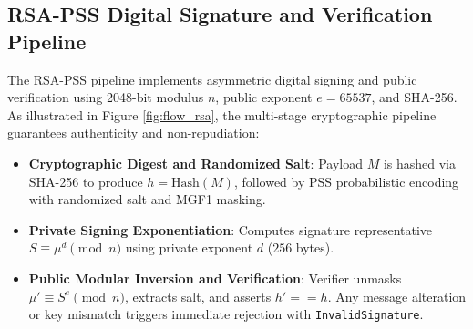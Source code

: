 \documentclass[12pt,a4paper]{report}
\begin{document}
\clearpage

\subsection{RSA-PSS Digital Signature and Verification Pipeline}
The RSA-PSS pipeline implements asymmetric digital signing and public verification using 2048-bit modulus $n$, public exponent $e = 65537$, and SHA-256. As illustrated in Figure \ref{fig:flow_rsa}, the multi-stage cryptographic pipeline guarantees authenticity and non-repudiation:
\begin{itemize}[leftmargin=1.5em,topsep=1pt,itemsep=1pt,parsep=0pt]
    \item \textbf{Cryptographic Digest and Randomized Salt}: Payload $M$ is hashed via SHA-256 to produce $h = \text{Hash}(M)$, followed by PSS probabilistic encoding with randomized salt and MGF1 masking.
    \item \textbf{Private Signing Exponentiation}: Computes signature representative $S \equiv \mu^d \pmod n$ using private exponent $d$ ($256$ bytes).
    \item \textbf{Public Modular Inversion and Verification}: Verifier unmasks $\mu' \equiv S^e \pmod n$, extracts salt, and asserts $h' == h$. Any message alteration or key mismatch triggers immediate rejection with \texttt{InvalidSignature}.
\end{itemize}
\end{document}
